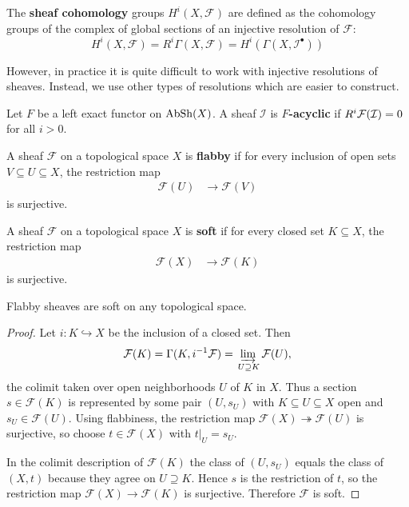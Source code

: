 \documentclass[12pt]{article}
\begin{document}
\begin{definition}
    The \textbf{sheaf cohomology} groups $H^i(X, \mathcal{F})$ are defined as the cohomology groups of the complex of global sections of an injective resolution of $\mathcal{F}$:
    \[H^i(X, \mathcal{F}) = R^i \Gamma(X, \mathcal{F}) = H^i(\Gamma(X, \mathcal{I}^\bullet))\]
\end{definition}

However, in practice it is quite difficult to work with injective resolutions of sheaves. Instead, we use other types of resolutions which are easier to construct.

\begin{definition}
    Let $F$ be a left exact functor on $\operatorname{AbSh}(X)$. A sheaf $\mathcal{I}$ is \textbf{$F$-acyclic} if $R^i {\mathcal{F}}(\mathcal{I}) = 0$ for all $i > 0$.
\end{definition}

\begin{definition}
    A sheaf $\mathcal{F}$ on a topological space $X$ is \textbf{flabby} if for every inclusion of open sets $V \subseteq U \subseteq X$, the restriction map \begin{align*}
        \mathcal{F}(U) & \to \mathcal{F}(V)
    \end{align*} is surjective.

\end{definition}
\begin{definition}
    A sheaf $\mathcal{F}$ on a topological space $X$ is \textbf{soft} if for every closed set $K \subseteq X$, the restriction map \begin{align*}
        \mathcal{F}(X) & \to \mathcal{F}(K)
    \end{align*} is surjective.
\end{definition}
\begin{proposition}
    Flabby sheaves are soft on any topological space. 
\end{proposition}
\begin{proof}
Let $i: K \hookrightarrow X$ be the inclusion of a closed set. Then
\[
\mathcal{F}(K)=\Gamma(K,i^{-1}\mathcal{F})
=\varinjlim_{\,U\supseteq K}\mathcal{F}(U),
\]
the colimit taken over open neighborhoods $U$ of $K$ in $X$. Thus a section $s\in\mathcal{F}(K)$ is represented by some pair $(U,s_U)$ with $K\subseteq U\subseteq X$ open and $s_U\in\mathcal{F}(U)$. Using flabbiness, the restriction map $\mathcal{F}(X)\twoheadrightarrow\mathcal{F}(U)$ is surjective, so choose $t\in\mathcal{F}(X)$ with $t|_U=s_U$.

In the colimit description of $\mathcal{F}(K)$ the class of $(U,s_U)$ equals the class of $(X,t)$ because they agree on $U\supseteq K$. Hence $s$ is the restriction of $t$, so the restriction map $\mathcal{F}(X)\to\mathcal{F}(K)$ is surjective. Therefore $\mathcal{F}$ is soft.
\end{proof}
\end{document}
